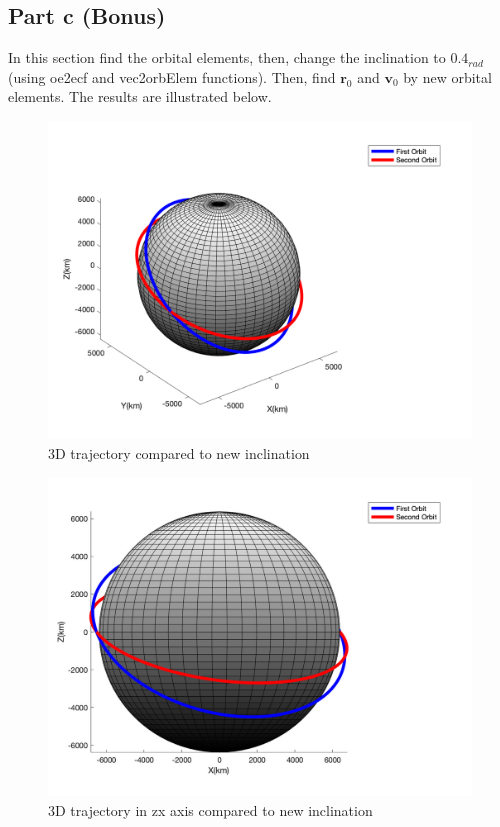 \subsection{Part c (Bonus)}

In this section find the orbital elements, then, change the inclination to $0.4_{rad}$ (using oe2ecf and vec2orbElem functions). Then, find $\boldsymbol{r}_0$ and $\boldsymbol{v}_0$ by new orbital elements.
The results are illustrated below.
\begin{figure}[H]
    \caption{3D trajectory compared to new inclination}
    \centering
    \includegraphics[width=16cm]{../Figure/Q2/3Dof_view_compare}
\end{figure}

\begin{figure}[H]
    \caption{3D trajectory in zx axis compared to new inclination}
    \centering
    \includegraphics[width=16cm]{../Figure/Q2/xz_view_compare}
\end{figure}

